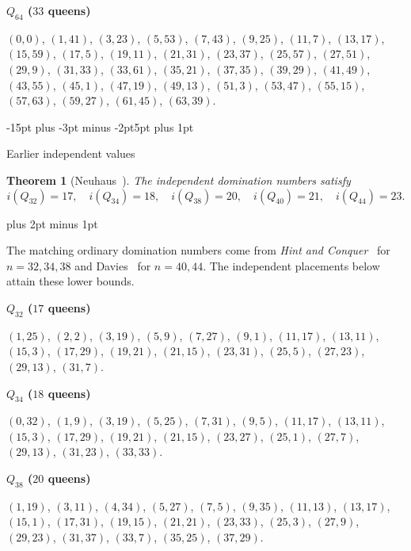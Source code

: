 \documentclass[11pt,a4paper]{article}
\makeatletter
\renewcommand{\subsection}{\@startsection{subsection}{2}{\z@}%
  {-15pt plus -3pt minus -2pt}{5pt plus 1pt}%
  {\normalfont\bfseries\raggedright}}
\renewenvironment{proof}[1][\proofname]{%
  \par\pushQED{\qed}\normalfont
  \topsep8pt plus 2pt minus 1pt\relax
  \trivlist\item[\hskip\labelsep\itshape #1\@addpunct{.}]\ignorespaces
}{\popQED\endtrivlist\@endpefalse}
\theoremstyle{result}
\newtheorem{theorem}{Theorem}[section]
\theoremstyle{definition}
\theoremstyle{remark}
\newenvironment{placement}[1]{%
  \par\addvspace{7pt}\begin{samepage}%
  \noindent\textbf{#1}\par\nobreak\noindent\ignorespaces
}{\par\end{samepage}}
\makeatother
\begin{document}
\begin{placement}{$Q_{64}$ ($33$ queens)}
$(0,0)$, $(1,41)$, $(3,23)$, $(5,53)$, $(7,43)$, $(9,25)$, $(11,7)$, $(13,17)$, $(15,59)$, $(17,5)$, $(19,11)$, $(21,31)$, $(23,37)$, $(25,57)$, $(27,51)$, $(29,9)$, $(31,33)$, $(33,61)$, $(35,21)$, $(37,35)$, $(39,29)$, $(41,49)$, $(43,55)$, $(45,1)$, $(47,19)$, $(49,13)$, $(51,3)$, $(53,47)$, $(55,15)$, $(57,63)$, $(59,27)$, $(61,45)$, $(63,39)$.
\end{placement}

\subsection{Earlier independent values}

\begin{theorem}[{Neuhaus~\cite[Section~2.4]{Neuhaus2009}}]\label{thm:indep}
The independent domination numbers satisfy
\[
  i(Q_{32})=17,\quad i(Q_{34})=18,\quad i(Q_{38})=20,\quad
  i(Q_{40})=21,\quad i(Q_{44})=23.
\]
\end{theorem}

\begin{proof}
The matching ordinary domination numbers come from
\emph{Hint and Conquer}~\cite{Hint2026} for $n=32,34,38$ and
Davies~\cite[Theorem~1.3 and Table~2]{Davies2026} for $n=40,44$.
The independent placements below attain these lower bounds.
\end{proof}

\begin{placement}{$Q_{32}$ ($17$ queens)}
$(1,25)$, $(2,2)$, $(3,19)$, $(5,9)$, $(7,27)$, $(9,1)$, $(11,17)$, $(13,11)$, $(15,3)$, $(17,29)$, $(19,21)$, $(21,15)$, $(23,31)$, $(25,5)$, $(27,23)$, $(29,13)$, $(31,7)$.
\end{placement}

\begin{placement}{$Q_{34}$ ($18$ queens)}
$(0,32)$, $(1,9)$, $(3,19)$, $(5,25)$, $(7,31)$, $(9,5)$, $(11,17)$, $(13,11)$, $(15,3)$, $(17,29)$, $(19,21)$, $(21,15)$, $(23,27)$, $(25,1)$, $(27,7)$, $(29,13)$, $(31,23)$, $(33,33)$.
\end{placement}

\begin{placement}{$Q_{38}$ ($20$ queens)}
$(1,19)$, $(3,11)$, $(4,34)$, $(5,27)$, $(7,5)$, $(9,35)$, $(11,13)$, $(13,17)$, $(15,1)$, $(17,31)$, $(19,15)$, $(21,21)$, $(23,33)$, $(25,3)$, $(27,9)$, $(29,23)$, $(31,37)$, $(33,7)$, $(35,25)$, $(37,29)$.
\end{placement}
\end{document}
